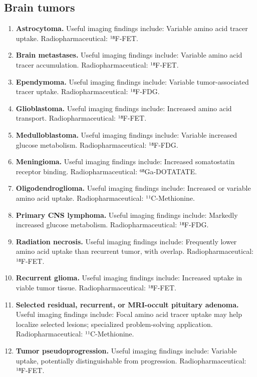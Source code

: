 \subsection{Brain tumors}
\begin{enumerate}[leftmargin=*,itemsep=0.45em,topsep=0.4em]
\item \textbf{Astrocytoma.} Useful imaging findings include: Variable amino acid tracer uptake. Radiopharmaceutical: ¹⁸F-FET.
\item \textbf{Brain metastases.} Useful imaging findings include: Variable amino acid tracer accumulation. Radiopharmaceutical: ¹⁸F-FET.
\item \textbf{Ependymoma.} Useful imaging findings include: Variable tumor-associated tracer uptake. Radiopharmaceutical: ¹⁸F-FDG.
\item \textbf{Glioblastoma.} Useful imaging findings include: Increased amino acid transport. Radiopharmaceutical: ¹⁸F-FET.
\item \textbf{Medulloblastoma.} Useful imaging findings include: Variable increased glucose metabolism. Radiopharmaceutical: ¹⁸F-FDG.
\item \textbf{Meningioma.} Useful imaging findings include: Increased somatostatin receptor binding. Radiopharmaceutical: ⁶⁸Ga-DOTATATE.
\item \textbf{Oligodendroglioma.} Useful imaging findings include: Increased or variable amino acid uptake. Radiopharmaceutical: ¹¹C-Methionine.
\item \textbf{Primary CNS lymphoma.} Useful imaging findings include: Markedly increased glucose metabolism. Radiopharmaceutical: ¹⁸F-FDG.
\item \textbf{Radiation necrosis.} Useful imaging findings include: Frequently lower amino acid uptake than recurrent tumor, with overlap. Radiopharmaceutical: ¹⁸F-FET.
\item \textbf{Recurrent glioma.} Useful imaging findings include: Increased uptake in viable tumor tissue. Radiopharmaceutical: ¹⁸F-FET.
\item \textbf{Selected residual, recurrent, or MRI-occult pituitary adenoma.} Useful imaging findings include: Focal amino acid tracer uptake may help localize selected lesions; specialized problem-solving application. Radiopharmaceutical: ¹¹C-Methionine.
\item \textbf{Tumor pseudoprogression.} Useful imaging findings include: Variable uptake, potentially distinguishable from progression. Radiopharmaceutical: ¹⁸F-FET.
\end{enumerate}

